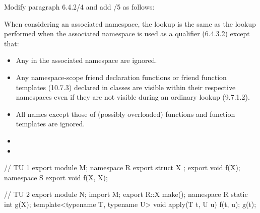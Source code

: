 Modify paragraph 6.4.2/4 and add /5 as follows:
\begin{std.txt}
  \pnum[4]
  When considering an associated namespace, the lookup is the same as
  the lookup performed when the associated namespace is used as a
  qualifier (6.4.3.2) except that:
  \begin{itemize}
    \item Any  in the associated
  namespace are ignored.

     \item Any namespace-scope friend declaration functions or friend
  function templates (10.7.3) declared in 
  classes 
  are visible within
  their respective namespaces even if they are not visible during an
  ordinary lookup (9.7.1.2).

     \item All names except those of (possibly overloaded) functions
  and function templates are ignored.

     \color{addclr}
     \item

    \item
  \end{itemize}

\pnum
\color{addclr}
\added{\enterexample}
\begin{codeblock}
// TU 1
export module M;
namespace R {
  export struct X {};
  export void f(X);
}
namespace S {
  export void f(X, X);
}
\end{codeblock}

\begin{codeblock}
// TU 2
export module N;
import M;
export R::X make();
namespace R { static int g(X); }
template<typename T, typename U> void apply(T t, U u) {
  f(t, u);
  g(t);
}
\end{codeblock}


\end{std.txt}
